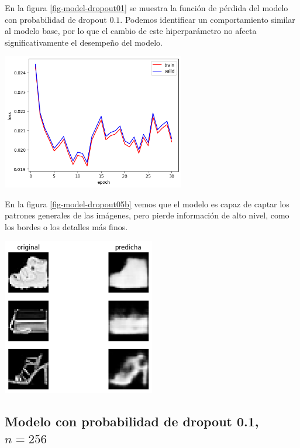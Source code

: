 \documentclass[aps,prl,reprint,groupedaddress]{revtex4-2}
\newenvironment{Figura}
  {\par\medskip\noindent\minipage{\linewidth}}
  {\endminipage\par\medskip}
\begin{document}
En la figura \ref{fig-model-dropout01} se muestra la función de pérdida del
modelo con probabilidad de dropout $0.1$. Podemos identificar un comportamiento 
similar al modelo base, por lo que el cambio de este hiperparámetro no afecta
significativamente el desempeño del modelo.
\begin{Figura}
  \centering
  \includegraphics[width=0.60\textwidth]{figs1/modelo_n64_dropout01.png}
  \label{fig-model-dropout01}
\end{Figura}

En la figura \ref{fig-model-dropout05b} vemos que el modelo es capaz de captar 
los patrones generales de las imágenes, pero pierde información de alto nivel, 
como los bordes o los detalles más finos.
\begin{Figura}
  \centering
  \includegraphics[width=0.5\textwidth]{figs1/test_modelo_n64_dropout_01.png}
  \label{fig-model-dropout05b}
\end{Figura}

\subsection{Modelo con probabilidad de dropout 0.1, $n=256$}
\end{document}
